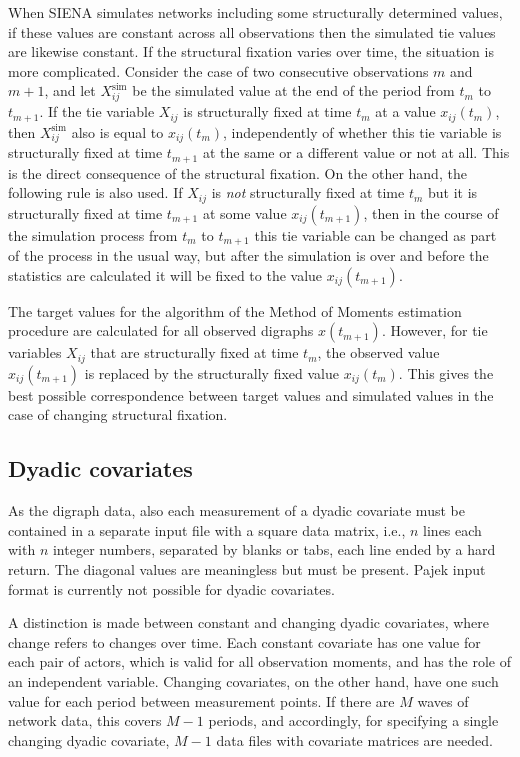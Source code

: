 \documentclass[a4paper,fleqn]{article}
\newcommand{\+}{\, + \,}
\newcommand{\SI}{{\sf SIENA }}
\begin{document}
{When \SI simulates networks including some structurally determined values,
if these values are constant across all observations then
the simulated tie values are likewise constant.
If the structural fixation varies over time, the situation
is more complicated.
Consider the case of two consecutive observations
$m$ and $m+1$,
and let $X^{\text{sim}}_{ij}$ be the simulated value
at the end of the period from $t_m$ to $t_{m+1}$.
If the tie variable $X_{ij}$ is structurally fixed at time $t_m$
at a value $x_{ij}(t_m)$,
then $X^{\text{sim}}_{ij}$ also is equal to $x_{ij}(t_m)$,
independently of whether this tie variable is structurally fixed
at time $t_{m+1}$ at the same or a different value or not at all.
This is the direct consequence of the structural fixation.
On the other hand, the following rule is also used.
If $X_{ij}$ is \emph{not} structurally fixed at time $t_m$
but it is structurally fixed at time $t_{m+1}$ at some value $x_{ij}(t_{m+1})$,
then in the course of the simulation process from  $t_m$ to $t_{m+1}$
this tie variable can be changed as part of the process in the usual way,
but after the simulation is over and before the statistics are calculated it will be fixed
to the value $x_{ij}(t_{m+1})$.

The target values for the algorithm of the Method of Moments estimation
procedure are calculated for all observed digraphs $x(t_{m+1})$.
However, for tie variables $X_{ij}$ that are
structurally fixed at time $t_m$, the observed value  $x_{ij}(t_{m+1})$
is replaced by the structurally fixed value  $x_{ij}(t_{m})$.
This gives the best possible correspondence between target values
and simulated values in the case of changing structural fixation.

\subsection{Dyadic covariates}

As the digraph data, also each measurement of a dyadic covariate
must be contained in a separate input file with a square data
matrix, i.e., $n$ lines each with $n$ integer numbers, separated by
blanks or tabs, each line ended by a hard return. The diagonal values are
meaningless but must be present.
Pajek input format is currently not possible for dyadic covariates.

A distinction is made between constant and changing dyadic
covariates, where change refers to changes over time. Each constant
covariate has one value for each pair of actors, which is valid for
all observation moments, and has the role of an independent
variable. Changing covariates, on the other hand, have one such
value for each period between measurement points. If there are $M$
waves of network data, this covers $M-1$ periods, and accordingly,
for specifying a single changing dyadic covariate, $M-1$ data files
with covariate matrices are needed.

}
\end{document}
